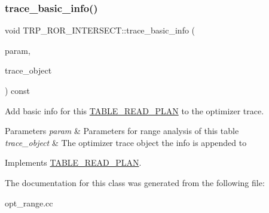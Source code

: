 \subsubsection{\texorpdfstring{trace\+\_\+basic\+\_\+info()}{trace\_basic\_info()}}
{\footnotesize\ttfamily void T\+R\+P\+\_\+\+R\+O\+R\+\_\+\+I\+N\+T\+E\+R\+S\+E\+C\+T\+::trace\+\_\+basic\+\_\+info (\begin{DoxyParamCaption}\item[{const \mbox{\hyperlink{classPARAM}{P\+A\+R\+AM}} $\ast$}]{param,  }\item[{\mbox{\hyperlink{classOpt__trace__object}{Opt\+\_\+trace\+\_\+object}} $\ast$}]{trace\+\_\+object }\end{DoxyParamCaption}) const\hspace{0.3cm}{\ttfamily [virtual]}}

Add basic info for this \mbox{\hyperlink{classTABLE__READ__PLAN}{T\+A\+B\+L\+E\+\_\+\+R\+E\+A\+D\+\_\+\+P\+L\+AN}} to the optimizer trace.


\begin{DoxyParams}{Parameters}
{\em param} & Parameters for range analysis of this table \\
\hline
{\em trace\+\_\+object} & The optimizer trace object the info is appended to \\
\hline
\end{DoxyParams}


Implements \mbox{\hyperlink{classTABLE__READ__PLAN_a35e1758c9edce0c8bea19a602409f861}{T\+A\+B\+L\+E\+\_\+\+R\+E\+A\+D\+\_\+\+P\+L\+AN}}.



The documentation for this class was generated from the following file\+:\begin{DoxyCompactItemize}
\item 
opt\+\_\+range.\+cc\end{DoxyCompactItemize}
